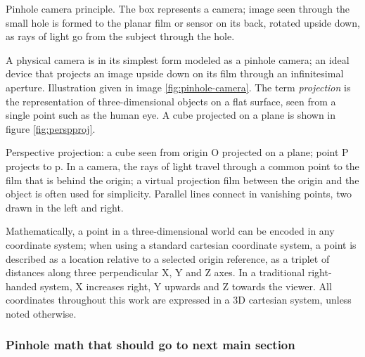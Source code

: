 

{Pinhole camera principle. The box represents a camera; image seen through the small hole is formed to the planar film or sensor on its back, rotated upside down, as rays of light go from the subject through the hole.}

A physical camera is in its simplest form modeled as a pinhole camera; an ideal device that projects an image upside down on its film through an infinitesimal aperture.
Illustration given in image \ref{fig:pinhole-camera}.
The term \emph{projection} is the representation of three-dimensional objects on a flat surface, seen from a single point such as the human eye.
A cube projected on a plane is shown in figure \ref{fig:perspproj}.

{Perspective projection: a cube seen from origin O projected on a plane; point P projects to p. In a camera, the rays of light travel through a common point to the film that is behind the origin; a virtual projection film between the origin and the object is often used for simplicity. Parallel lines connect in vanishing points, two drawn in the left and right.}



Mathematically, a point in a three-dimensional world can be encoded in any coordinate system;
when using a standard cartesian coordinate system, a point is described as a location relative to a selected origin reference, as a triplet of distances along three perpendicular X, Y and Z axes. %
In a traditional right-handed system, X increases right, Y upwards and Z towards the viewer.
All coordinates throughout this work are expressed in a 3D cartesian system, unless noted otherwise.



\subsubsection{Pinhole math that should go to next main section}

